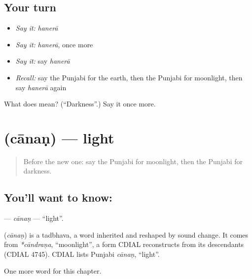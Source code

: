 \subsection*{Your turn}
\begin{itemize}
\raggedright
  \item \emph{Say it:} \emph{hanerā}
  \item \emph{Say it:} \emph{hanerā}, once more
  \item \emph{Say it:} say \emph{hanerā}
  \item \emph{Recall:} say the Punjabi for the earth, then the Punjabi for moonlight, then say \emph{hanerā} again
\end{itemize}

\begin{tcolorbox}[breakable,colback=teal!4,colframe=teal!35!black,title={Before you move on}]
What does  mean? (\textquotedblleft{}Darkness\textquotedblright{}.) Say it once more.
\end{tcolorbox}
\section[\texorpdfstring{\pa{ਚਾਨਣ} (cānaṇ)}{ਚਾਨਣ (cānaṇ)}]{ (cānaṇ) — light}

\label{lesson:PA-C129-canan}



\begin{quote}
Before the new one: say the Punjabi for moonlight, then the Punjabi for darkness.
\end{quote}

\subsection*{You'll want to know: }
\textbf{} — \emph{cānaṇ} — \textquotedblleft{}light\textquotedblright{}.

\begin{cousinweb}
\textbf{} (\emph{cānaṇ}) is a tadbhava, a word inherited and reshaped by sound change. It comes from \emph{*cāndraṇa}, \textquotedblleft{}moonlight\textquotedblright{}, a form CDIAL reconstructs from its descendants (CDIAL 4745). CDIAL lists Punjabi \emph{cānaṇ}, \textquotedblleft{}light\textquotedblright{}.
\end{cousinweb}

\begin{grammarlens}[title={What you've built}]
One more word for this chapter.
\end{grammarlens}

